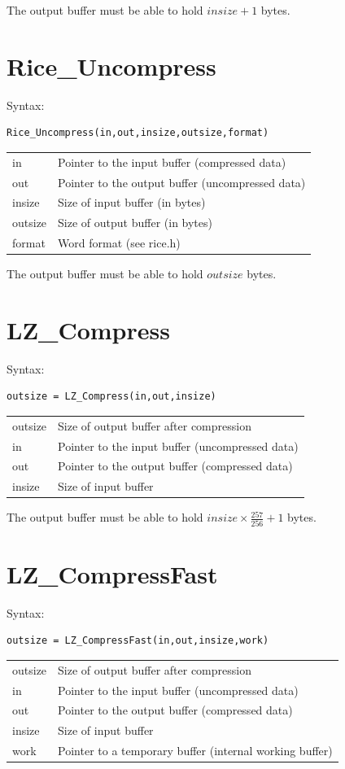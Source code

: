 \documentclass[a4paper,11pt,oneside]{report}
\begin{document}
The output buffer must be able to hold $insize+1$ bytes.


\section{Rice\_Uncompress}
Syntax:
\begin{lstlisting}
Rice_Uncompress(in,out,insize,outsize,format)
\end{lstlisting}

\begin{tabular}{ll}
in      & Pointer to the input buffer (compressed data)\\
out     & Pointer to the output buffer (uncompressed data)\\
insize  & Size of input buffer (in bytes)\\
outsize & Size of output buffer (in bytes)\\
format  & Word format (see rice.h)
\end{tabular}

The output buffer must be able to hold $outsize$ bytes.


\section{LZ\_Compress}
Syntax:
\begin{lstlisting}
outsize = LZ_Compress(in,out,insize)
\end{lstlisting}

\begin{tabular}{ll}
outsize & Size of output buffer after compression\\
in      & Pointer to the input buffer (uncompressed data)\\
out     & Pointer to the output buffer (compressed data)\\
insize  & Size of input buffer
\end{tabular}

The output buffer must be able to hold $insize\times\frac{257}{256}+1$ bytes.


\section{LZ\_CompressFast}
Syntax:
\begin{lstlisting}
outsize = LZ_CompressFast(in,out,insize,work)
\end{lstlisting}

\begin{tabular}{ll}
outsize & Size of output buffer after compression\\
in      & Pointer to the input buffer (uncompressed data)\\
out     & Pointer to the output buffer (compressed data)\\
insize  & Size of input buffer\\
work    & Pointer to a temporary buffer (internal working buffer)
\end{tabular}
\end{document}
